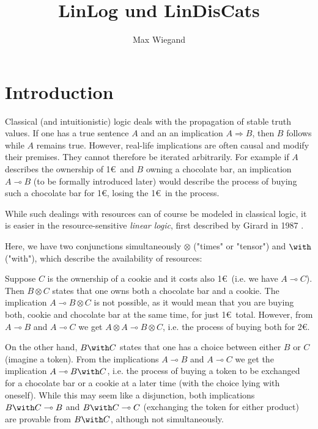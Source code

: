 \documentclass[DIN, pagenumber=false, fontsize=11pt, parskip=half, colorinlistoftodos, svgnames]{scrartcl}
\title{LinLog und LinDisCats}
\author{Max Wiegand}
\begin{document}
	\maketitle
	
	\section{Introduction}
	
	
	
	Classical (and intuitionistic) logic deals with the propagation of stable truth values. 
	If one has a true sentence $A$ and an an implication $A \Rightarrow B$, then $B$ follows while $A$ remains true. 
	However, real-life implications are often causal and modify their premises. 
	They cannot therefore be iterated arbitrarily. 
	For example if $A$ describes the ownership of 1\euro\ and $B$ owning a chocolate bar, an implication $A \multimap B$ (to be formally introduced later) would describe the process of buying such a chocolate bar for 1\euro, losing the 1\euro\ in the process.
	
	While such dealings with resources can of course be modeled in classical logic, it is easier in the resource-sensitive \emph{linear logic}, first described by Girard in 1987 \cite{girard87}. 
	
	Here, we have two conjunctions simultaneously $\otimes$ ("times" or "tensor") and $\with$ ("with"), which describe the availability of resources:
	
	Suppose $C$ is the ownership of a cookie and it costs also 1\euro\ (i.e. we have $A\multimap C$).
	Then $B \otimes C$ states that one owns both a chocolate bar and a cookie. 
	The implication $A \multimap B \otimes C$ is not possible, as it would mean that you are buying both, cookie and chocolate bar at the same time, for just 1\euro\ total. 
	However, from $A \multimap B$ and $A\multimap C$ we get $A \otimes A \multimap B \otimes C$, i.e. the process of buying both for 2\euro.
	
	On the other hand, $B \with C$ states that one has a choice between either $B$ or $C$ (imagine a token). 
	From the implications $A\multimap B$ and $A\multimap C$ we get the implication $A \multimap B \with C$, i.e. the process of buying a token to be exchanged for a chocolate bar or a cookie at a later time (with the choice lying with oneself). 
	While this may  seem like a disjunction, both implications $B\with C \multimap B$ and $B \with C \multimap C$ (exchanging the token for either product) are provable from $B \with C$, although not simultaneously. 
	
\end{document}
